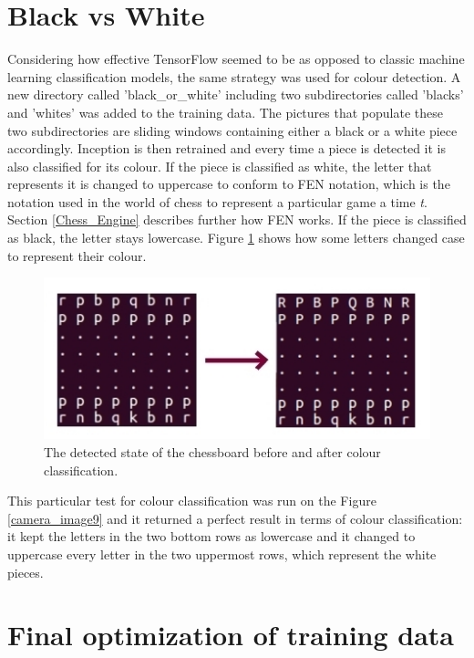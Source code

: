 \documentclass{l4proj}
\begin{document}
\pagebreak
\vspace*{20mm}
\section{Black vs White} \label{BlackVsWhite}

Considering how effective TensorFlow seemed to be as opposed to classic machine learning classification models, the same strategy was used for colour detection. A new directory called 'black\_or\_white' including two subdirectories called 'blacks' and 'whites' was added to the training data. The pictures that populate these two subdirectories are sliding windows containing either a black or a white piece accordingly. Inception is then retrained and every time a piece is detected it is also classified for its colour. If the piece is classified as white, the letter that represents it is changed to uppercase to conform to FEN notation, which is the notation used in the world of chess to represent a particular game a time \textit{t}. Section \ref{Chess_Engine} describes further how FEN works. If the piece is classified as black, the letter stays lowercase. Figure \ref{ColourDetected} shows how some letters changed case to represent their colour.

\begin{figure}[h!]
\centering
\includegraphics[scale=0.8]{detection_colour_comparison.jpg}
\caption{The detected state of the chessboard before and after colour classification.}
\label{ColourDetected}
\end{figure}

\vspace{5mm}
This particular test for colour classification was run on the Figure \ref{camera_image9} and it returned a perfect result in terms of colour classification: it kept the letters in the two bottom rows as lowercase and it changed to uppercase every letter in the two uppermost rows, which represent the white pieces.

\vspace{10mm}
\section{Final optimization of training data} \label{FinalTrainingData}
\end{document}
